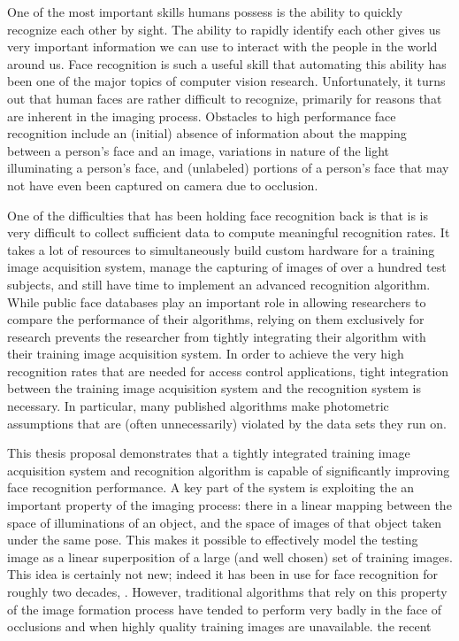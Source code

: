 One of the most important skills humans possess is the ability to quickly
recognize each other by sight.   The ability to rapidly identify each other
gives us very important information we can use to interact with the people in
the world around us.  Face recognition is such a useful skill that automating
this ability has been one of the major topics of computer vision research.
Unfortunately, it turns out that human faces are rather difficult to recognize,
primarily for reasons that are inherent in the imaging process.  Obstacles to
high performance face recognition include an (initial) absence of information
about the mapping between a person's face and an image, variations in nature of
the light illuminating a person's face, and (unlabeled) portions of a person's
face that may not have even been captured on camera due to occlusion.  

One of the difficulties that has been holding face recognition back is that is
is very difficult to collect sufficient data to compute meaningful recognition
rates.  It takes a lot of resources to simultaneously build custom hardware for
a training image acquisition system, manage the capturing of images of over a
hundred test subjects, and still have time to implement an advanced recognition
algorithm.  While public face databases play an important role in allowing
researchers to compare the performance of their algorithms, relying on them
exclusively for research prevents the researcher from tightly integrating their
algorithm with their training image acquisition system.  In order to achieve
the very high recognition rates that are needed for access control
applications, tight integration between the training image acquisition system
and the recognition system is necessary.  In particular, many published
algorithms make photometric assumptions that are (often unnecessarily) violated
by the data sets they run on.

This thesis proposal demonstrates that a tightly integrated training image
acquisition system and recognition algorithm is capable of significantly
improving face recognition performance.  A key part of the system is exploiting
the an important property of the imaging process:  there in a linear mapping
between the space of illuminations of an object, and the space of images of
that object taken under the same pose.  This makes it possible to effectively
model the testing image as a linear superposition of a large (and well chosen)
set of training images.  This idea is certainly not new; indeed it has been in
use for face recognition for roughly two decades, \cite{Turk1991-CVPR}.
However, traditional algorithms that rely on this property of the image
formation process have tended to perform very badly in the face of occlusions
and when highly quality training images are unavailable.  the recent 

